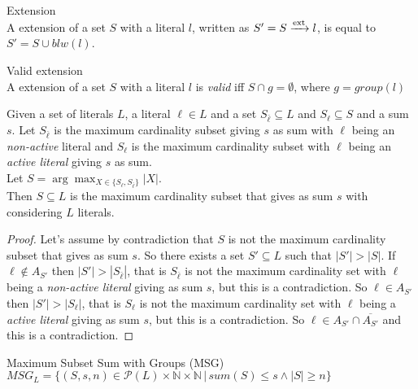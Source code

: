 \begin{definition}{Extension}\\
    A extension of a set $S$ with a literal $l$, written as $S' = S \xrightarrow{\text{ext}} l$,
    is equal to $S' = S \cup blw(l)$.
\end{definition}

\begin{definition}{Valid extension}\\
    A extension of a set $S$ with a literal $l$ is \textit{valid} iff
    $S \cap g =  \emptyset$, where $g= group(l)$
\end{definition}


\begin{lemma}
    Given a set of literals $L$, a literal $\ell \in L$ and a set $S_{\bar{\ell}} \subseteq  L$
    and $S_{\ell} \subseteq S$ and a sum $s$.
    Let $S_{\bar{\ell}}$ is the maximum cardinality subset giving $s$ as sum with $\ell$ being an \textit{non-active} literal
    and $S_{\ell}$ is the maximum cardinality subset with $\ell$ being an \textit{active literal} giving $s$  as sum.\\
    Let $ S = \arg\max_{X \in \{S_{\ell}, S_{\bar{\ell}}\}} |X| $. \\ 
    Then $S \subseteq L$ is the maximum cardinality subset that gives as sum $s$ with considering
    $L$ literals.
    \label{lemma1}
\end{lemma}

\begin{proof}
    Let's assume by contradiction that $S$ is not the maximum cardinality subset that gives as sum $s$.
    So there exists a set $S' \subseteq L$ such that $|S'| > |S|$.
    If $\ell \not\in A_{S'}$ then $|S'| > |S_{\bar{\ell}}|$, that is $S_{\bar{\ell}}$ 
    is not the maximum cardinality set 
    with $\ell$ being a \textit{non-active literal} giving as sum $s$, but this is a contradiction.
    So $\ell \in A_{S'}$ then $|S'| > |S_{\ell}|$, that is $S_{\ell}$ is not the maximum cardinality set 
    with $\ell$ being a \textit{active literal} giving as sum $s$, but this is a contradiction.
    So $\ell \in A_{S'} \cap \overline{A_{S'}}$ and this is a contradiction.
\end{proof}

\begin{definition}{Maximum Subset Sum with Groups (MSG)}\\
    $MSG_L = \{ (S,s,n) \in \mathcal{P}(L) \times \mathbb{N} \times \mathbb{N} \,|\, sum(S) \le s \land |S| \ge n\}$
\end{definition}

